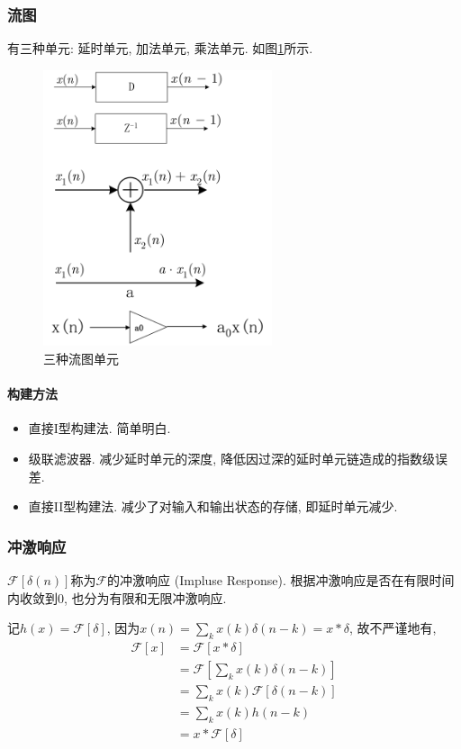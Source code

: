\documentclass{ctexart}
\begin{document}
\subsubsection{流图}
    有三种单元: 延时单元, 加法单元, 乘法单元. 如图\ref{sys-unit-graph}所示.
    \begin{figure}[ht]
    \centering
    \includegraphics[width=0.6\textwidth]{sys-unit-graph.png}
    \caption{三种流图单元}
    \label{sys-unit-graph}
    \end{figure}
\paragraph{构建方法} \begin{itemize}
        \item 直接I型构建法. 简单明白.
        \item 级联滤波器. 减少延时单元的深度, 降低因过深的延时单元链造成的指数级误差.
        \item 直接II型构建法. 减少了对输入和输出状态的存储, 即延时单元减少.
    \end{itemize}
\subsubsection{冲激响应}
    $\mathcal{F}[\delta(n)]$称为$\mathcal{F}$的冲激响应 (Impluse Response).
    根据冲激响应是否在有限时间内收敛到$0$, 也分为有限和无限冲激响应.\par
    记$h(x) = \mathcal{F}[\delta]$, 因为$x(n) = \sum_k x(k) \delta(n - k) = x * \delta$,
    故不严谨地有,
    \begin{align*}
        \mathcal{F}\left[x\right] &= \mathcal{F}\left[x * \delta\right] \\ 
        &= \mathcal{F}\left[\sum_k x(k)\delta(n - k)\right]\\
        &= \sum_k x(k) \mathcal{F}\left[\delta(n - k)\right]\\
        &= \sum_k x(k) h(n - k)\\
        &= x * \mathcal{F}\left[\delta\right]
    \end{align*}
\end{document}
